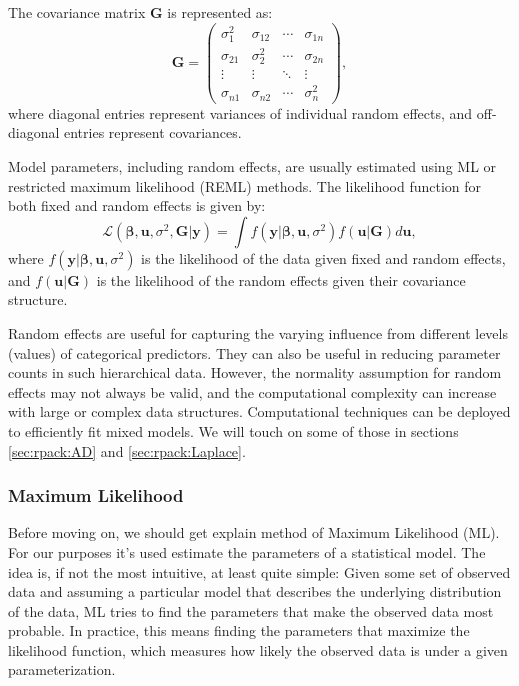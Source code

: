\documentclass[12pt, twoside,hidelinks]{article}
\theoremstyle{definition}
\numberwithin{equation}{section}
\begin{document}
The covariance matrix $\mathbf{G}$ is represented as:
\begin{equation}
\mathbf{G} = \begin{pmatrix}
\sigma^2_1 & \sigma_{12} & \cdots & \sigma_{1n} \\
\sigma_{21} & \sigma^2_2 & \cdots & \sigma_{2n} \\
\vdots & \vdots & \ddots & \vdots \\
\sigma_{n1} & \sigma_{n2} & \cdots & \sigma^2_n
\end{pmatrix},
\label{eq:covariance_matrix}
\end{equation}
where diagonal entries represent variances of individual random effects, and off-diagonal entries represent covariances.
\newline

Model parameters, including random effects, are usually estimated using ML or restricted maximum likelihood (REML) methods. The likelihood function for both fixed and random effects is given by:
\begin{equation}
\mathcal{L}(\boldsymbol{\beta}, \boldsymbol{u}, \sigma^2, \mathbf{G} | \mathbf{y}) = \int f(\mathbf{y} | \boldsymbol{\beta}, \boldsymbol{u}, \sigma^2) f(\boldsymbol{u} | \mathbf{G}) d\boldsymbol{u},
\label{eq:likelihood_function_random_effects}
\end{equation}
where $f(\mathbf{y} | \boldsymbol{\beta}, \boldsymbol{u}, \sigma^2)$ is the likelihood of the data given fixed and random effects, and $f(\boldsymbol{u} | \mathbf{G})$ is the likelihood of the random effects given their covariance structure.
\newline

Random effects are useful for capturing the varying influence from different levels (values) of categorical predictors. They can also be useful in reducing parameter counts in such hierarchical data. However, the normality assumption for random effects may not always be valid, and the computational complexity can increase with large or complex data structures. Computational techniques can be deployed to efficiently fit mixed models. We will touch on some of those in sections \ref{sec:rpack:AD} and \ref{sec:rpack:Laplace}. 

\subsubsection{Maximum Likelihood}\label{sec:regmod:linmixmod:ml}

Before moving on, we should get explain method of Maximum Likelihood (ML). For our purposes it's used estimate the parameters of a statistical model. The idea is, if not the most intuitive, at least quite simple: Given some set of observed data and assuming a particular model that describes the underlying distribution of the data, ML tries to find the parameters that make the observed data most probable.
In practice, this means finding the parameters that maximize the likelihood function, which measures how likely the observed data is under a given parameterization.
\end{document}
